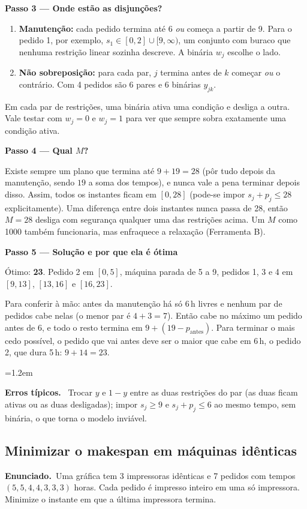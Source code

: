 \documentclass[11pt,a4paper]{article}
\newcommand{\enunciado}{\par\textbf{Enunciado.}\ }
\newcommand{\passo}[1]{\par\medskip\textbf{#1}\par}
\newenvironment{nota}[1]{\par\smallskip\begin{list}{}{\leftmargin=1.2em\rightmargin=0pt}\item[]\textbf{#1.}\ }{\end{list}}
\begin{document}
\passo{Passo 3 --- Onde estão as disjunções?}
\begin{enumerate}[label=(\roman*)]
  \item \textbf{Manutenção:} cada pedido termina até 6 \emph{ou} começa a partir de 9. Para o pedido 1, por exemplo,
        $s_1\in[0,2]\cup[9,\infty)$, um conjunto com buraco que nenhuma restrição linear sozinha descreve.
        A binária $w_j$ escolhe o lado.
  \item \textbf{Não sobreposição:} para cada par, $j$ termina antes de $k$ começar \emph{ou} o contrário. Com 4
        pedidos são 6 pares e 6 binárias $y_{jk}$.
\end{enumerate}
Em cada par de restrições, uma binária ativa uma condição e desliga a outra. Vale testar com $w_j=0$ e
$w_j=1$ para ver que sempre sobra exatamente uma condição ativa.

\passo{Passo 4 --- Qual $M$?}
Existe sempre um plano que termina até $9+19=28$ (pôr tudo depois da manutenção, sendo $19$ a soma dos tempos),
e nunca vale a pena terminar depois disso. Assim, todos os instantes ficam em $[0, 28]$ (pode-se impor
$s_j+p_j\le28$ explicitamente). Uma diferença entre dois instantes nunca passa de 28, então
\textbf{$M=28$} desliga com segurança qualquer uma das restrições acima. Um $M$ como 1000 também funcionaria,
mas enfraquece a relaxação (Ferramenta B).

\passo{Passo 5 --- Solução e por que ela é ótima}
Ótimo: \textbf{23}. Pedido 2 em $[0,5]$, máquina parada de 5 a 9, pedidos 1, 3 e 4 em $[9,13]$, $[13,16]$ e $[16,23]$.

Para conferir à mão: antes da manutenção há só 6\,h livres e nenhum par de pedidos cabe nelas (o menor par é
$4+3=7$). Então cabe no máximo um pedido antes de 6, e todo o resto termina em
$9+(19-p_{\text{antes}})$. Para terminar o mais cedo possível, o pedido que vai antes deve ser o maior que cabe
em 6\,h, o pedido 2, que dura 5\,h: $9+14=23$.

\begin{nota}{Erros típicos}
Trocar $y$ e $1-y$ entre as duas restrições do par (as duas ficam ativas ou as duas desligadas); impor
$s_j\ge9$ e $s_j+p_j\le6$ ao mesmo tempo, sem binária, o que torna o modelo inviável.
\end{nota}

\subsection{Minimizar o makespan em máquinas idênticas}
\enunciado Uma gráfica tem 3 impressoras idênticas e 7 pedidos com tempos $(5, 5, 4, 4, 3, 3, 3)$ horas. Cada
pedido é impresso inteiro em uma só impressora. Minimize o instante em que a última impressora termina.
\end{document}
